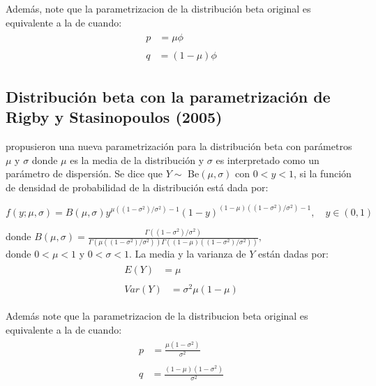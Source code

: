 Adem\'{a}s, note que la parametrizacion de la distribuci\'{o}n beta original es equivalente a la de \cite{Ferrari2} cuando:
\begin{align}
\begin{split}
	p &= \mu\phi
\end{split} \label{FC_Origin1} \\
\begin{split}
q &= (1-\mu)\phi
\end{split} \label{FC_Origin2}
\end{align}

\subsection{Distribuci\'{o}n beta con la parametrizaci\'{o}n de Rigby y Stasinopoulos (2005)}\label{Sec:Dist_rigby}

\cite{Stasinopoulos2} propusieron una nueva parametrizaci\'{o}n para la distribuci\'{o}n beta con par\'{a}metros $\mu$ y $\sigma$ donde $\mu$ es la media de la distribuci\'{o}n y $\sigma$ es interpretado como un par\'{a}metro de dispersi\'{o}n. Se dice que $Y \sim$ Be$(\mu,\sigma)$ con $0<y<1$, si la funci\'{o}n de densidad de probabilidad de la distribuci\'{o}n est\'{a} dada por:

\begin{equation}
f(y;\mu,\sigma)=B(\mu,\sigma)y^{\mu((1-\sigma^2)/\sigma^2)-1}(1-y)^{(1-\mu)((1-\sigma^2)/\sigma^2)-1}, \quad y \in (0, 1)
\end{equation}

donde $B(\mu,\sigma)=\frac{\Gamma((1-\sigma^2)/\sigma^2)}{\Gamma(\mu((1-\sigma^2)/\sigma^2))\Gamma((1-\mu)((1-\sigma^2)/\sigma^2))},$\\

donde $0<\mu<1$ y $0<\sigma<1$. La media y la varianza de $Y$ est\'{a}n dadas por:
\begin{align}
\begin{split}
	E(Y) &= \mu 
\end{split} \label{E_RS} \\
\begin{split}
	Var(Y) &= \sigma^2\mu(1-\mu)
\end{split} \label{V_RS}
\end{align}

Adem\'{a}s note que la parametrizacion de la distribucion beta original es equivalente a la de \cite{Stasinopoulos2} cuando:
\begin{align}
\begin{split}
	p &= \frac{\mu(1-\sigma^2)}{\sigma^2}
\end{split} \label{RS_Origin1} \\
\begin{split}
q &= \frac{(1-\mu)(1-\sigma^2)}{\sigma^2} 
\end{split} \label{RS_Origin2}
\end{align}

